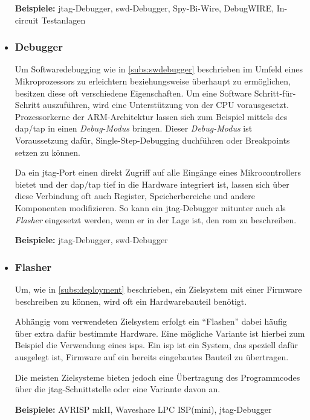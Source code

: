 \begin{itemize}
  \textbf{Beispiele:} \gls{jtag}-Debugger, \gls{swd}-Debugger, Spy-Bi-Wire,
  DebugWIRE, In-circuit Testanlagen
  \item \subsubsection*{Debugger}\label{subs:hwdebugger}  Um
  Softwaredebugging wie in \autoref{subs:swdebugger} beschrieben im Umfeld eines
  Mikroprozessors zu erleichtern beziehungsweise überhaupt zu ermöglichen,
  besitzen diese oft verschiedene Eigenschaften.
  Um eine Software Schritt-für-Schritt auszuführen, wird eine Unterstützung von
  der CPU vorausgesetzt. Prozessorkerne der ARM-Architektur lassen sich zum
  Beispiel mittels des \gls{dap}/\gls{tap} in einen \emph{Debug-Modus}
  bringen. Dieser \emph{Debug-Modus} ist Voraussetzung dafür,
  Single-Step-Debugging duchführen oder Breakpoints setzen zu können.
  
  Da ein \gls{jtag}-Port einen direkt Zugriff auf alle Eingänge eines
  Mikrocontrollers bietet und der \gls{dap}/\gls{tap} tief in die Hardware
  integriert ist, lassen sich über diese Verbindung oft auch Register,
  Speicherbereiche und andere Komponenten modifizieren. So kann ein
  \gls{jtag}-Debugger mitunter auch als \emph{Flasher} eingesetzt werden, wenn
  er in der Lage ist, den \gls{rom} zu beschreiben.
  
  \textbf{Beispiele:} \gls{jtag}-Debugger, \gls{swd}-Debugger
  \item \subsubsection*{Flasher} Um, wie in \autoref{subs:deployment}
  beschrieben, ein Zielsystem mit einer Firmware beschreiben zu können, wird
  oft ein Hardwarebauteil benötigt.
  
  Abhängig vom verwendeten Zielsystem erfolgt ein "`Flashen"' dabei häufig über
  extra dafür bestimmte Hardware. Eine mögliche Variante ist hierbei zum
  Beispiel die Verwendung eines \glspl{isp}. Ein \gls{isp} ist ein System, das
  speziell dafür ausgelegt ist, Firmware auf ein bereits eingebautes Bauteil zu
  übertragen.
  
  Die meisten Zielsysteme bieten jedoch eine Übertragung des Programmcodes über
  die \gls{jtag}-Schnittstelle oder eine Variante davon an.

  \textbf{Beispiele:} AVRISP mkII, Waveshare LPC ISP(mini), \gls{jtag}-Debugger
\end{itemize}
